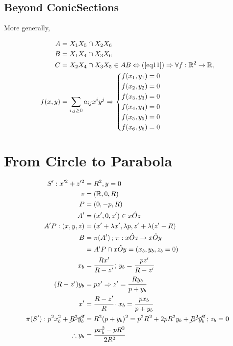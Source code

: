 \documentclass[12pt]{article}
\begin{document}
\normalsize

\subsection{Beyond ConicSections}

More generally,

\begin{align}
    A &= X_1 X_5 \cap X_2 X_6 \\
    B &= X_1 X_4 \cap X_3 X_6 \\
    C &= X_2 X_4 \cap X_3 X_5 \in AB\Leftrightarrow (\ref{eq11}) \Rightarrow \forall f : \mathbb{R}^2 \to \mathbb{R},\\
    f(x,y) &= \sum_{i,j\ge 0} a_{ij} x^i y^j\Rightarrow \left\{\begin{aligned}
        f(x_1,y_1) &= 0 \\
        f(x_2,y_2) &= 0 \\
        f(x_3,y_3) &= 0 \\
        f(x_4,y_4) &= 0 \\
        f(x_5,y_5) &= 0 \\
        f(x_6,y_6) &= 0 
    \end{aligned}\right. 
\end{align}

\section{From Circle to Parabola}

\begin{align}
S': x'^2 + z'^2 &= R^2, y = 0 \\
v &= (\mathbb{R}, 0, R) \\
P &= (0, -p, R) \\
A' &= (x', 0, z') \in x\hat Oz \\
A'P: (x,y,z) &= (x' + \lambda x', \lambda p, z' + \lambda (z' - R) \\
B &= \pi(A')\,;\,\pi: x\hat Oz \to x\hat Oy \\
&= A'P \cap x\hat O y = (x_b, y_b, z_b = 0) \\
x_b &= \cfrac{Rx'}{R-z'}\,;\,y_b = \cfrac{pz'}{R-z'} \\
(R - z') y_b &= pz' \Rightarrow z' = \cfrac{Ry_b}{p+y_b} \\
x' &= \cfrac{R-z'}{R}\cdot x_b = \cfrac{px_b}{p+y_b} \\
\pi(S'): p^2 x_b^2 + \cancel{R^2 y_b^2} &= R^2 (p+y_b)^2 = p^2 R^2 + 2pR^2y_b + \cancel{R^2 y_b^2}\,;\,z_b=0 \\
\therefore y_b &= \cfrac{px_b^2 - p R^2}{2R^2}
\end{align}
\end{document}
